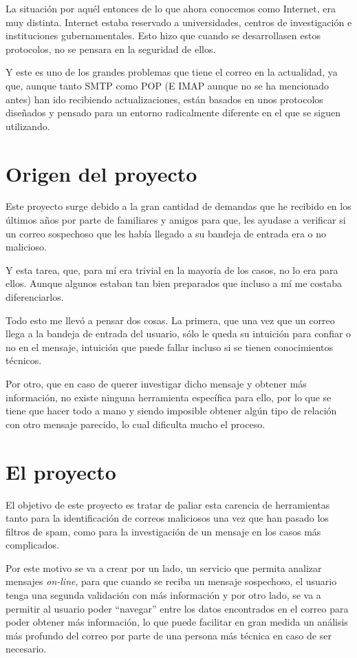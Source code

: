 La situación por aquél entonces de lo que ahora conocemos como Internet, era muy distinta. Internet estaba reservado a universidades, centros de investigación e instituciones gubernamentales. Esto hizo que cuando se desarrollasen estos protocolos, no se pensara en la seguridad de ellos.

Y este es uno de los grandes problemas que tiene el correo en la actualidad, ya que, aunque tanto SMTP como POP (E IMAP \cite{rfc1064} aunque no se ha mencionado antes) han ido recibiendo actualizaciones, están basados en unos protocolos diseñados y pensado para un entorno radicalmente diferente en el que se siguen utilizando.

\section{Origen del proyecto}
Este proyecto surge debido a la gran cantidad de demandas que he recibido en los últimos años por parte de familiares y amigos para que, les ayudase a verificar si un correo sospechoso que les había llegado a su bandeja de entrada era o no malicioso. 

Y esta tarea, que, para mí era trivial en la mayoría de los casos, no lo era para ellos. Aunque algunos estaban tan bien preparados que incluso a mí me costaba diferenciarlos. 

Todo esto me llevó a pensar dos cosas. La primera, que una vez que un correo llega a la bandeja de entrada del usuario, sólo le queda su intuición para confiar o no en el mensaje, intuición que puede fallar incluso si se tienen conocimientos técnicos.

Por otro, que en caso de querer investigar dicho mensaje y obtener más información, no existe ninguna herramienta específica para ello, por lo que se tiene que hacer todo a mano y siendo imposible obtener algún tipo de relación con otro mensaje parecido, lo cual dificulta mucho el proceso. 

\section{El proyecto}
El objetivo de este proyecto es tratar de paliar esta carencia de herramientas tanto para la identificación de correos maliciosos una vez que han pasado los filtros de spam, como para la investigación de un mensaje en los casos más complicados. 

Por este motivo se va a crear por un lado, un servicio que permita analizar mensajes \textit{on-line}, para que cuando se reciba un mensaje sospechoso, el usuario tenga una segunda validación con más información y por otro lado, se va a permitir al usuario poder “navegar” entre los datos encontrados en el correo para poder obtener más información, lo que puede facilitar en gran medida un análisis más profundo del correo por parte de una persona más técnica en caso de ser necesario.

